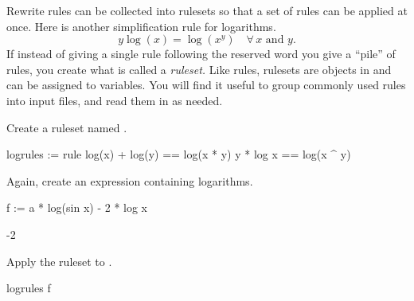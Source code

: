 {Rewrite rules can be collected
into rulesets so that a set of rules can be applied at once.
Here is another simplification rule for logarithms.
\begin{displaymath}
y \log(x) = \log(x^y) \quad\forall \, x \text{ and } y.
\end{displaymath}
If instead of giving a single rule following the reserved word 
you give a ``pile'' of rules, you create
what is called a {\it ruleset.}
Like rules, rulesets are objects in \Language{} and
can be assigned to variables.
You will find it useful to group commonly used rules into input files, and read
them in as needed.
\begin{xtc}
\begin{xtccomment}
Create a ruleset named .
\end{xtccomment}
\begin{spadsrc}
logrules := rule
  log(x) + log(y) == log(x * y)
  y * log x       == log(x ^ y)
\end{spadsrc}
\begin{TeXOutput}
\begin{fricasmath}{4}
%
\end{fricasmath}
\end{TeXOutput}
\end{xtc}
\begin{xtc}
\begin{xtccomment}
Again, create an expression  containing logarithms.
\end{xtccomment}
\begin{spadsrc}
f := a * log(sin x) - 2 * log x 
\end{spadsrc}
\begin{TeXOutput}
\begin{fricasmath}{5}
\TIMES {}-{2\TIMES {}}%
\end{fricasmath}
\end{TeXOutput}
\end{xtc}
\begin{xtc}
\begin{xtccomment}
Apply the ruleset  to .
\end{xtccomment}
\begin{spadsrc}
logrules f 
\end{spadsrc}
\begin{TeXOutput}
\begin{fricasmath}{6}
%
\end{fricasmath}
\end{TeXOutput}
\end{xtc}

}
